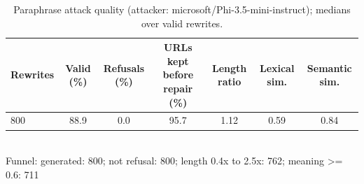 \begin{table}[t]
\centering
\caption{Paraphrase attack quality (attacker: microsoft/Phi-3.5-mini-instruct); medians over valid rewrites.}
\label{tab:quality}
\footnotesize
\begin{tabular}{lcccccc}
\toprule
\textbf{Rewrites} & \textbf{Valid (\%)} & \textbf{Refusals (\%)} & \textbf{URLs kept before repair (\%)} & \textbf{Length ratio} & \textbf{Lexical sim.} & \textbf{Semantic sim.} \\
\midrule
800 & 88.9 & 0.0 & 95.7 & 1.12 & 0.59 & 0.84 \\
\bottomrule
\end{tabular}
\\[2pt]{\scriptsize Funnel: generated: 800; not refusal: 800; length 0.4x to 2.5x: 762; meaning >= 0.6: 711}
\end{table}